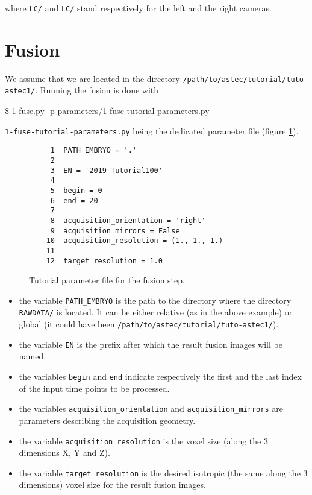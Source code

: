 where \texttt{LC/} and \texttt{LC/} stand respectively for the left
and the right cameras.





\section{Fusion}
\label{sec:tutorial:fusion}

We assume that we are located in the directory
\texttt{/path/to/astec/tutorial/tuto-astec1/}. Running the fusion is
done with
\begin{code}{0.8}
  \$ 1-fuse.py -p parameters/1-fuse-tutorial-parameters.py
\end{code}
\texttt{1-fuse-tutorial-parameters.py} being the dedicated parameter file  (figure \ref{fig:tutorial:parameter:fusion}).

\begin{figure}
\begin{framed}
\begin{verbatim}
     1	PATH_EMBRYO = '.'
     2	
     3	EN = '2019-Tutorial100'
     4	
     5	begin = 0
     6	end = 20
     7	
     8	acquisition_orientation = 'right'
     9	acquisition_mirrors = False
    10	acquisition_resolution = (1., 1., 1.)
    11	
    12	target_resolution = 1.0
\end{verbatim}
\end{framed}
\caption{\label{fig:tutorial:parameter:fusion} Tutorial parameter file for the fusion step.}
\end{figure}

\begin{itemize}
  \item the variable \texttt{PATH\_EMBRYO} is the path to the directory where
    the directory \texttt{RAWDATA/} is located. It can be either relative (as in the
    above example) or
    global (it could have been \texttt{/path/to/astec/tutorial/tuto-astec1/}).
  \item the variable \texttt{EN} is the prefix after which the result fusion images
    will be named. 
  \item the variables \texttt{begin} and \texttt{end} indicate respectively the
    first and the last index of the input time points to be processed.
  \item the variables \texttt{acquisition\_orientation} and \texttt{acquisition\_mirrors} are parameters
    describing the acquisition geometry.
  \item the variable \texttt{acquisition\_resolution} is the voxel size (along the 3
    dimensions X, Y and Z).
  \item the variable \texttt{target\_resolution} is the desired isotropic (the
    same along the 3 dimensions) voxel size for the result fusion images.
\end{itemize}

